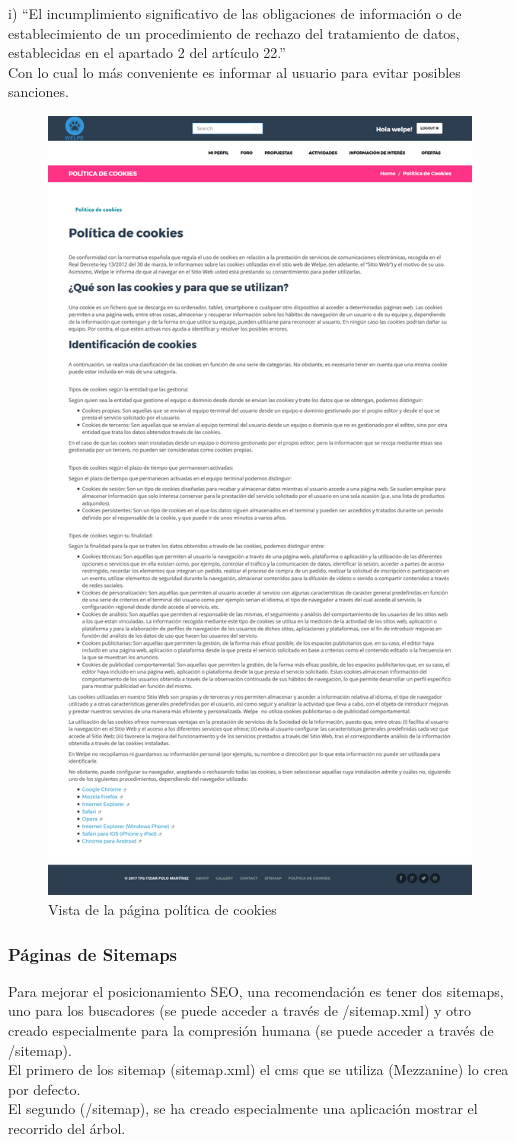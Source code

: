 i) ``El incumplimiento significativo de las obligaciones de información o de establecimiento de un procedimiento de rechazo del tratamiento de datos, establecidas en el apartado 2 del artículo 22.''\\
Con lo cual lo más conveniente es informar al usuario para evitar posibles sanciones.
 \begin{figure}[H]
    \centering
    \includegraphics[width=12cm]{img/politica_cookies}
    \caption{Vista de la página política de cookies}
    \label{figura:politica_cookies}
 \end{figure}

\subsubsection{Páginas de Sitemaps}
\label{subsubsec:sitemap}
Para mejorar el posicionamiento SEO, una recomendación es  tener dos sitemaps, uno para los buscadores (se puede acceder a través de /sitemap.xml) y otro creado especialmente para la compresión humana (se puede acceder a través de /sitemap).\\
El primero de los sitemap (sitemap.xml) el cms que se utiliza (Mezzanine) lo crea por defecto.\\
El segundo (/sitemap), se ha creado especialmente una aplicación mostrar el recorrido del árbol.

